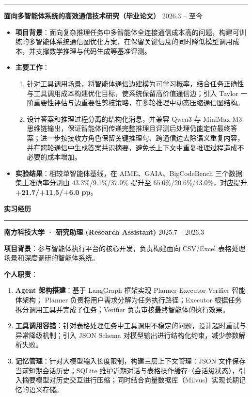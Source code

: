 \documentclass[10pt,a4paper]{ctexart}
\newcommand{\cvsection}[1]{%
  \vspace{3mm}%
  {\large\bfseries\textcolor{sec}{#1}}\par
  \vspace{-0.5mm}
  {\color{sec}\rule[2pt]{\linewidth}{0.55pt}}\vspace{-1mm}
}
\begin{document}
\textcolor{gray}{\rule{\linewidth}{0.4pt}}

\textbf{\large 面向多智能体系统的高效通信技术研究（毕业论文）} \hfill {\large 2026.3 -- 至今}
\begin{itemize}

    \item \textbf{项目背景}：面向复杂推理任务中多智能体全连接通信成本高的问题，构建可训练的多智能体系统通信图优化方案，在保留关键信息的同时降低模型调用成本，并支撑数学推理与代码生成等基准评测。

    \item \textbf{主要工作}：
    \begin{enumerate}
        \item 针对工具调用场景，将智能体通信边建模为可学习概率，结合任务正确性与工具调用成本构建优化目标，使系统保留高价值通信边；引入 Taylor 一阶重要性评估与边重要性剪枝策略，在多轮推理中动态压缩通信图结构。

        \item 设计答案和推理过程分离的结构化消息，并兼容 Qwen3 与 MiniMax-M3 思维链输出，保证智能体间传递完整推理且评测后处理仍能定位最终答案；进一步按接收方角色保留关键推理句、跨通信边去除语义重复内容，并在跨轮通信中生成答案共识摘要，避免长上下文中重复推理过程造成不必要的成本增加。

    \end{enumerate}

    \item \textbf{实验结果}：相较单智能体基线，在 AIME、GAIA、BigCodeBench 三个数据集上准确率分别由 43.3\%/9.1\%/37.0\% 提升至 65.0\%/20.6\%/43.0\%，对应提升 \textbf{+21.7/+11.5/+6.0 pp}。



\end{itemize}






\cvsection{实习经历}
\vspace{-0.1em}
\textbf{\large 南方科技大学 · 研究助理 (Research Assistant)} \hfill {\large 2025.7 -- 2026.3}

\vspace{0.3em}
\textbf{项目背景}：参与智能体执行平台的核心开发，负责构建面向 CSV/Excel 表格处理场景和深度调研的智能体系统。

\textbf{个人职责}：
\begin{enumerate}
    \item \textbf{Agent 架构搭建}：基于 LangGraph 框架实现 Planner-Executor-Verifier 智能体架构；
    Planner 负责将用户需求分解为任务执行路径；Executor 根据任务拆分调用工具并完成子任务；Verifier 负责审核最终智能体的执行效果。
    
    \item \textbf{工具调用容错}：针对表格处理任务中工具调用不稳定的问题，设计超时重试与异常降级机制；引入 JSON Schema 对模型输出进行结构化约束，减少参数解析失败。


    \item \textbf{记忆管理}：针对大模型输入长度限制，构建三层上下文管理：JSON 文件保存当前短期会话历史；SQLite 维护近期对话与表格操作缓存（会话级状态），引入摘要模型对历史交互进行压缩；同时结合向量数据库（Milvus）实现长期记忆的语义存储。
\end{enumerate}
\end{document}
